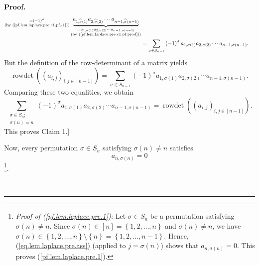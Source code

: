 \documentclass[numbers=enddot,12pt,final,onecolumn,notitlepage,english]{scrartcl}%
\theoremstyle{definition}
\newenvironment{proof}[1][Proof]{\noindent\textbf{#1.} }{\ \rule{0.5em}{0.5em}}
\let\sumnonlimits\sum
\renewcommand{\sum}{\sumnonlimits\limits}
\newenvironment{verlong}{}{}
\begin{document}
\begin{verlong}
\begin{proof}
\begin{align*}
{{}}_{\substack{=\left(  -1\right)  ^{\sigma}\\\text{(by
(\ref{pf.lem.laplace.pre.c1.pf.-1}))}}}\underbrace{a_{1,\widehat{\sigma
}\left(  1\right)  }a_{2,\widehat{\sigma}\left(  2\right)  }\cdots
a_{n-1,\widehat{\sigma}\left(  n-1\right)  }}_{\substack{=a_{1,\sigma\left(
1\right)  }a_{2,\sigma\left(  2\right)  }\cdots a_{n-1,\sigma\left(
n-1\right)  }\\\text{(by (\ref{pf.lem.laplace.pre.c1.pf.prod}))}}}\\
&  =\sum_{\sigma\in S_{n-1}}\left(  -1\right)  ^{\sigma}a_{1,\sigma\left(
1\right)  }a_{2,\sigma\left(  2\right)  }\cdots a_{n-1,\sigma\left(
n-1\right)  }.
\end{align*}
But the definition of the row-determinant of a matrix yields%
\[
\operatorname*{rowdet}\left(  \left(  a_{i,j}\right)  _{i,j\in\left[
n-1\right]  }\right)  =\sum_{\sigma\in S_{n-1}}\left(  -1\right)  ^{\sigma
}a_{1,\sigma\left(  1\right)  }a_{2,\sigma\left(  2\right)  }\cdots
a_{n-1,\sigma\left(  n-1\right)  }.
\]
Comparing these two equalities, we obtain%
\[
\sum_{\substack{\sigma\in S_{n};\\\sigma\left(  n\right)  =n}}\left(
-1\right)  ^{\sigma}a_{1,\sigma\left(  1\right)  }a_{2,\sigma\left(  2\right)
}\cdots a_{n-1,\sigma\left(  n-1\right)  }=\operatorname*{rowdet}\left(
\left(  a_{i,j}\right)  _{i,j\in\left[  n-1\right]  }\right)  .
\]
This proves Claim 1.] \medskip

Now, every permutation $\sigma\in S_{n}$ satisfying $\sigma\left(  n\right)
\neq n$ satisfies
\begin{equation}
a_{n,\sigma\left(  n\right)  }=0 \label{pf.lem.laplace.pre.1}%
\end{equation}
\footnote{\textit{Proof of (\ref{pf.lem.laplace.pre.1}):} Let $\sigma\in
S_{n}$ be a permutation satisfying $\sigma\left(  n\right)  \neq n$. Since
$\sigma\left(  n\right)  \in\left[  n\right]  =\left\{  1,2,\ldots,n\right\}
$ and $\sigma\left(  n\right)  \neq n$, we have $\sigma\left(  n\right)
\in\left\{  1,2,\ldots,n\right\}  \setminus\left\{  n\right\}  =\left\{
1,2,\ldots,n-1\right\}  $. Hence, (\ref{eq.lem.laplace.pre.ass}) (applied to
$j=\sigma\left(  n\right)  $) shows that $a_{n,\sigma\left(  n\right)  }=0$.
This proves (\ref{pf.lem.laplace.pre.1}).}.


\end{proof}
\end{verlong}
\end{document}
